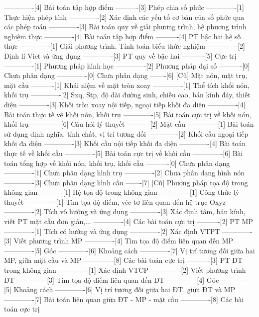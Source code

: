 -------------[4] Bài toán tập hợp điểm
----------[3] Phép chia số phức
-------------[1] Thực hiện phép tính
-------------[2] Xác định các yếu tố cơ bản của số phức qua các phép toán
-------------[3] Bài toán quy về giải phương trình, hệ phương trình nghiệm thực
-------------[4] Bài toán tập hợp điểm
----------[4] PT bậc hai hệ số thực
-------------[1] Giải phương trình. Tính toán biểu thức nghiệm
-------------[2] Định lí Viet và ứng dụng
-------------[3] PT quy về bậc hai
----------[5] Cực trị
-------------[1] Phương pháp hình học
-------------[2] Phương pháp đại số
----------[0] Chưa phân dạng
-------------[0] Chưa phân dạng
-------[6] [Cũ] Mặt nón, mặt trụ, mặt cầu
----------[1] Khái niệm về mặt tròn xoay
-------------[1] Thể tích khối nón, khối trụ
-------------[2] Sxq, Stp, độ dài đường sinh, chiều cao, bán kính đáy, thiết diện
-------------[3] Khối tròn xoay nội tiếp, ngoại tiếp khối đa diện
-------------[4] Bài toán thực tế về khối nón, khối trụ
-------------[5] Bài toán cực trị về khối nón, khối trụ
-------------[6] Câu hỏi lý thuyết
----------[2] Mặt cầu
-------------[1] Bài toán sử dụng định nghĩa, tính chất, vị trí tương đối
-------------[2] Khối cầu ngoại tiếp khối đa diện
-------------[3] Khối cầu nội tiếp khối đa diện
-------------[4] Bài toán thực tế về khối cầu
-------------[5] Bài toán cực trị về khối cầu
-------------[6] Bài toán tổng hợp về khối nón, khối trụ, khối cầu
----------[0] Chưa phân dạng
-------------[1] Chưa phân dạng hình trụ
-------------[2] Chưa phân dạng hình nón
-------------[3] Chưa phân dạng hình cầu
-------[7] [Cũ] Phương pháp tọa độ trong không gian
----------[1] Hệ tọa độ trong không gian
-------------[1] Công thức lý thuyết
-------------[1] Tìm tọa độ điểm, véc-tơ liên quan đến hệ trục Oxyz
-------------[2] Tích vô hướng và ứng dụng
-------------[3] Xác định tâm, bán kính, viết PT mặt cầu đơn giản,...
-------------[4] Các bài toán cực trị
----------[2] PT MP
-------------[1] Tích có hướng và ứng dụng
-------------[2] Xác định VTPT
-------------[3] Viết phương trình MP
-------------[4] Tìm tọa độ điểm liên quan đến MP
-------------[5] Góc
-------------[6] Khoảng cách
-------------[7] Vị trí tương đối giữa hai MP, giữa mặt cầu và MP
-------------[8] Các bài toán cực trị
----------[3] PT ĐT trong không gian
-------------[1] Xác định VTCP
-------------[2] Viết phương trình ĐT
-------------[3] Tìm tọa độ điểm liên quan đến ĐT
-------------[4] Góc
-------------[5] Khoảng cách
-------------[6] Vị trí tương đối giữa hai ĐT, giữa ĐT và MP
-------------[7] Bài toán liên quan giữa ĐT - MP - mặt cầu
-------------[8] Các bài toán cực trị
